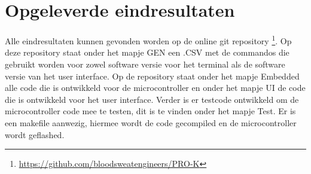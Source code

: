 \section{Opgeleverde eindresultaten}
Alle eindresultaten kunnen gevonden worden op de online git repository \footnote{\href{https://github.com/bloodsweatengineers/PRO-K}{https://github.com/bloodsweatengineers/PRO-K}}. Op deze repository staat onder het mapje GEN een .CSV met de commandos die gebruikt worden voor zowel software versie voor het terminal als de software versie van het user interface. Op de repository staat onder het mapje Embedded alle code die is ontwikkeld voor de microcontroller en onder het mapje UI de code die is ontwikkeld voor het user interface. Verder is er testcode ontwikkeld om de microcontroller code mee te testen, dit is te vinden onder het mapje Test. Er is een makefile aanwezig, hiermee wordt de code gecompiled en de microcontroller wordt geflashed.